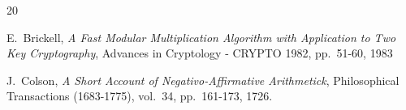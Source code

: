 \documentclass{llncs}
\begin{document}
\begin{thebibliography}{20}


E.~Brickell,
\emph{A Fast Modular Multiplication Algorithm with Application to Two Key
Cryptography},
Advances in Cryptology - CRYPTO 1982, pp.~51-60, 1983








J.~Colson,
\emph{A Short Account of Negativo-Affirmative Arithmetick},
Philosophical Transactions (1683-1775), vol.~34, pp.~161-173, 1726.


\end{thebibliography}
\end{document}
